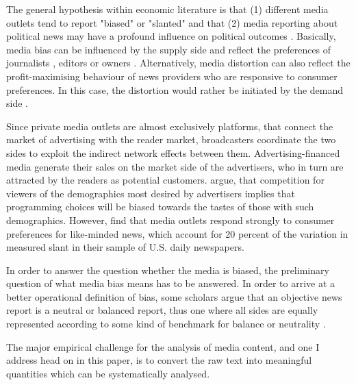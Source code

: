 \documentclass[12pt,a4paper,notitlepage]{article}
\begin{document}
The general hypothesis within economic literature is that (1) different media outlets tend to report "biased" or "slanted" \citep{groseclose_measure_2005, lott_is_2014} and that (2) media reporting about political news may have a profound influence on political outcomes \citep{gentzkow_media_2004, stromberg_radios_2004, dellavigna_fox_2006, snyder_press_2010, gentzkow_television_2006}. Basically, media bias can be influenced by the supply side and reflect the preferences of journalists \citep{baron_persistent_2006}, editors or owners \citep{besley_handcuffs_2006}. Alternatively, media distortion can also reflect the profit-maximising behaviour of news providers who are responsive to consumer preferences. In this case, the distortion would rather be initiated by the demand side \citep{mullainathan_market_2005, gentzkow_media_2006, suen_self-perpetuation_2004}. 

Since private media outlets are almost exclusively platforms, that connect the market of advertising with the reader market, broadcasters coordinate the two sides to exploit the indirect network effects between them. Advertising-financed media generate their sales on the market side of the advertisers, who in turn are attracted by the readers as potential customers. \citet{anderson_media_2006} argue, that competition for viewers of the demographics most desired by advertisers implies that programming choices will be biased towards the tastes of those with such demographics. However, \citet{gentzkow_what_2010} find that media outlets respond strongly to consumer preferences for like-minded news, which account for 20 percent of the variation in measured slant in their sample of U.S. daily newspapers.

In order to answer the question whether the media is biased, the preliminary question of what media bias means has to be answered. In order to arrive at a better operational definition of bias, some scholars argue that an objective news report is a neutral or balanced report, thus one where all sides are equally represented according to some kind of benchmark for balance or neutrality \citep{eberl_one_2017}. 


The major empirical challenge for the analysis of media content, and one I address head on in this paper, is to convert the raw text into meaningful quantities which can be systematically analysed. 
\end{document}
